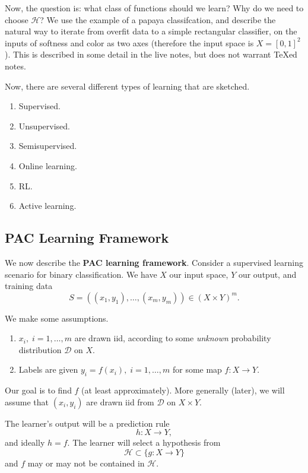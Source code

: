 \documentclass{article}
\begin{document}
Now, the question is: what class of functions should we learn? Why do we need to choose $\mathcal{H}$? We use the example of a papaya classifcation, and describe the natural way to iterate from overfit data to a simple rectangular classifier, on the inputs of softness and color as two axes (therefore the input space is $X = [0, 1]^2$). This is described in some detail in the live notes, but does not warrant TeXed notes.

Now, there are several different types of learning that are sketched.
\begin{enumerate}
\item Supervised.
\item Unsupervised.
\item Semisupervised.
\item Online learning.
\item RL.
\item Active learning.
\end{enumerate}

\subsection{PAC Learning Framework}

We now describe the \textbf{PAC learning framework}. Consider a supervised learning scenario for binary classification. We have $X$ our input space, $Y$ our output, and training data
\begin{equation}
  S = ((x_1, y_1), \dots, (x_m, y_m) ) \in (X \times Y)^m.
\end{equation}

We make some assumptions.
\begin{enumerate}
\item $x_i, \; i = 1, \dots, m$ are drawn iid, according to some \textit{unknown} probability distribution $\mathcal{D}$ on $X$.
\item Labels are given $y_i = f(x_i), \; i = 1, \dots, m$ for some map $f: X \rightarrow Y$.
\end{enumerate}

Our goal is to find $f$ (at least approximately). More generally (later), we will assume that $(x_i, y_i)$ are drawn iid from $\mathcal{D}$ on $X \times Y$.

The learner's output will be a prediction rule
\begin{equation}
  h : X \rightarrow Y,
\end{equation}
and ideally $h = f$. The learner will select a hypothesis from
\begin{equation}
  \mathcal{H} \subset \{ g : X \rightarrow Y \}
\end{equation}
and $f$ may or may not be contained in $\mathcal{H}$.
\end{document}
